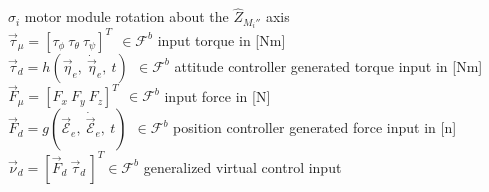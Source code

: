 \documentclass[a4paper, 11pt, oneside, openright, parskip=full]{book}
\begin{document}
$\sigma_i$ motor module rotation about the $\hat{Z}_{M_i''}$ axis\\
$\vec{\tau}_\mu = [\tau_\phi~\tau_\theta~\tau_\psi]^T~~\in\mathcal{F}^b$ input torque in [Nm]\\
$\vec{\tau}_d = h(\vec{\eta}_e,~\dot{\vec{\eta}}_e,~t)~~\in\mathcal{F}^b$ attitude controller generated torque input in [Nm]\\
$\vec{F}_\mu=[F_x~F_y~F_z]^T~~\in\mathcal{F}^b$ input force in [N]\\
$\vec{F}_d=g(\vec{\mathcal{E}}_e,~\dot{\vec{\mathcal{E}}}_e,~t)~~\in\mathcal{F}^b$ position controller generated force input in [n]\\
$\vec{\nu}_d=[\vec{F}_d~\vec{\tau}_d\hspace{2pt}]^T\in\mathcal{F}^b$ generalized virtual control input\\
\tableofcontents

\listoffigures

\listoftables



\mainmatter








\end{document}

